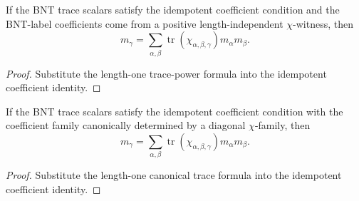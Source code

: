 \begin{theorem}%
    \label{thm:mpdo_bnt_label_idempotent_eq_sum_chi_trace}
    \leanok
    If the BNT trace scalars satisfy the idempotent coefficient condition and
    the BNT-label coefficients come from a positive length-independent
    $\chi$-witness, then
    \[
        m_\gamma =
        \sum_{\alpha,\beta}
        \operatorname{tr}(\chi_{\alpha,\beta,\gamma})
        m_\alpha m_\beta.
    \]
\end{theorem}
\begin{proof}\leanok
    Substitute the length-one trace-power formula into the idempotent
    coefficient identity.
\end{proof}

\begin{theorem}%
    \label{thm:mpdo_bnt_label_idempotent_eq_sum_of_chi_trace}
    \leanok
    If the BNT trace scalars satisfy the idempotent coefficient condition with
    the coefficient family canonically determined by a diagonal
    $\chi$-family, then
    \[
        m_\gamma =
        \sum_{\alpha,\beta}
        \operatorname{tr}(\chi_{\alpha,\beta,\gamma})
        m_\alpha m_\beta.
    \]
\end{theorem}
\begin{proof}\leanok
    Substitute the length-one canonical trace formula into the idempotent
    coefficient identity.
\end{proof}


